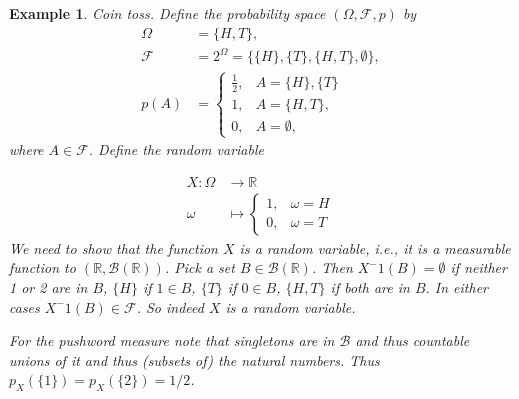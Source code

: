 \documentclass[10pt,a4paper]{article}
\newtheorem{example}{Example}
\begin{document}
\begin{example}\textit{Coin toss.} \label{ex_cointoss}
Define the probability space $(\Omega, \mathcal F, p)$ by  
\begin{align*}
\Omega &= \{H, T\}, \\
 \mathcal F &=2^\Omega = \{ \{H\}, \{T\},  \{H, T\}, \emptyset \}, \\
 p(A) &=
 \begin{cases}
 	\frac{1}{2}, & A =  \{H\}, \{T\} \\
 	1, & A = \{H, T\}, \\
 	0, & A= \emptyset,
 \end{cases}
\end{align*}
where $A\in \mathcal F$. Define the random variable

\begin{align*}
	X : \Omega &\rightarrow \mathbb R   \\
	     \omega &\mapsto \begin{cases}
	     	1, & \omega = H \\
	     	0, & \omega = T 
	     \end{cases}
\end{align*}
We need to show that the function $X$ is a random variable, i.e., it is a measurable function to $(\mathbb R, \mathcal B(\mathbb R))$. Pick a  set $B \in \mathcal B(\mathbb R)$. Then $X^-1(B) = \emptyset $ if neither 1 or 2 are in $B$,    $\{H\}$ if $1 \in B$, $\{T\}$ if $0 \in B$, $\{H, T\}$ if both are in $B$. In either cases $X^-1(B) \in \mathcal F$. So indeed $X$ is a random variable.

For the pushword measure note that singletons are in $\mathcal  B$ and thus countable unions of it and thus (subsets of) the natural numbers. Thus $p_X(\{1\}) = p_X(\{2\}) =  1/2$. 
\end{example}
\end{document}
